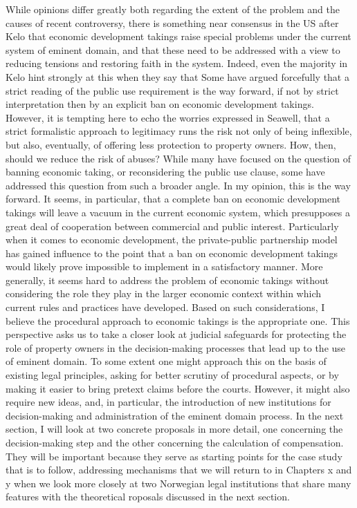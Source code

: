 {While opinions differ greatly both regarding the extent of the problem and the causes of recent controversy, there is something near consensus in the US after Kelo that economic development takings raise special problems under the current system of eminent domain, and that these need to be addressed with a view to reducing tensions and restoring faith in the system. Indeed, even the majority in Kelo hint strongly at this when they say that  
Some have argued forcefully that a strict reading of the public use requirement is the way forward, if not by strict interpretation then by an explicit ban on economic development takings.  However, it is tempting here to echo the worries expressed in Seawell, that a strict formalistic approach to legitimacy runs the risk not only of being inflexible, but also, eventually, of offering less  protection to property owners. How, then, should we reduce the risk of abuses?
While many have focused on the question of banning economic taking, or reconsidering the public use clause, some have addressed this question from such a broader angle. In my opinion, this is the way forward. It seems, in particular, that a complete ban on economic development takings will leave a vacuum in the current economic system, which presupposes a great deal of cooperation between commercial and public interest. Particularly when it comes to economic development, the private-public partnership model has gained influence to the point that a ban on economic development takings would likely prove impossible to implement in a satisfactory manner. 
More generally, it seems hard to address the problem of economic takings without considering the role they play in the larger economic context within which current rules and practices have developed. Based on such considerations, I believe the procedural approach to economic takings is the appropriate one. This perspective asks us to take a closer look at judicial safeguards for protecting the role of property owners in the decision-making processes that lead up to the use of eminent domain. To some extent one might approach this on the basis of existing legal principles, asking for better scrutiny of procedural aspects, or by making it easier to bring pretext claims before the courts. However, it might also require new ideas, and, in particular, the introduction of new institutions for decision-making and administration of the eminent domain process.} In the next section, I will look at two concrete proposals in more detail, one concerning the decision-making step and the other concerning the calculation of compensation. 
They will be important because they serve as starting points for the case study that is to follow, addressing mechanisms that we will return to in Chapters x and y when we look more closely at two Norwegian legal institutions that share many features with the theoretical roposals discussed in the next section.

